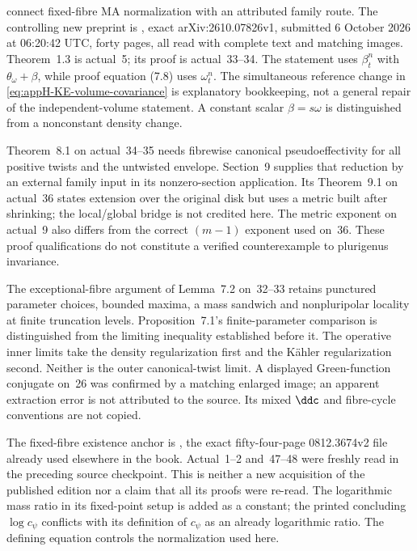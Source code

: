 connect fixed-fibre MA normalization with an attributed family route.
The controlling new preprint is \cite{LPWZ26KEV1}, exact
arXiv:2610.07826v1, submitted 6 October 2026 at 06:20:42 UTC,
forty pages, all read with complete text and matching images.
Theorem~1.3 is actual~5; its proof is actual~33--34. The statement
uses $\beta_t^n$ with $\theta_\omega+\beta$, while proof equation
(7.8) uses $\omega_t^n$. The simultaneous reference change in
\eqref{eq:appH-KE-volume-covariance} is explanatory bookkeeping,
not a general repair of the independent-volume statement.
A constant scalar $\beta=s\omega$ is distinguished from a
nonconstant density change.

Theorem~8.1 on actual~34--35 needs fibrewise canonical
pseudoeffectivity for all positive twists and the untwisted envelope.
Section~9 supplies that reduction by an external family input in
its nonzero-section application. Its Theorem~9.1 on actual~36
states extension over the original disk but uses a metric built
after shrinking; the local/global bridge is not credited here.
The metric exponent on actual~9 also differs from the correct
$(m-1)$ exponent used on~36. These proof qualifications do not
constitute a verified counterexample to plurigenus invariance.

The exceptional-fibre argument of Lemma~7.2 on~32--33 retains
punctured parameter choices, bounded maxima, a mass sandwich
and nonpluripolar locality at finite truncation levels. Proposition~7.1's
finite-parameter comparison is distinguished from the limiting
inequality established before it. The operative inner limits take
the density regularization first and the K\"ahler regularization
second. Neither is the outer canonical-twist limit. A displayed
Green-function conjugate on~26 was confirmed by a matching enlarged
image; an apparent extraction error is not attributed to the source.
Its mixed $\ddc$ and fibre-cycle conventions are not copied.

The fixed-fibre existence anchor is
\cite[Theorem~6.1, actual pp.~47--48]{BEGZ10BigV2}, the exact
fifty-four-page 0812.3674v2 file already used elsewhere in the book.
Actual~1--2 and~47--48 were freshly read in the preceding source
checkpoint. This is neither a new acquisition of the published
edition nor a claim that all its proofs were re-read. The logarithmic
mass ratio in its fixed-point setup is added as a constant; the
printed concluding $\log c_\psi$ conflicts with its definition of
$c_\psi$ as an already logarithmic ratio. The defining equation
controls the normalization used here.

